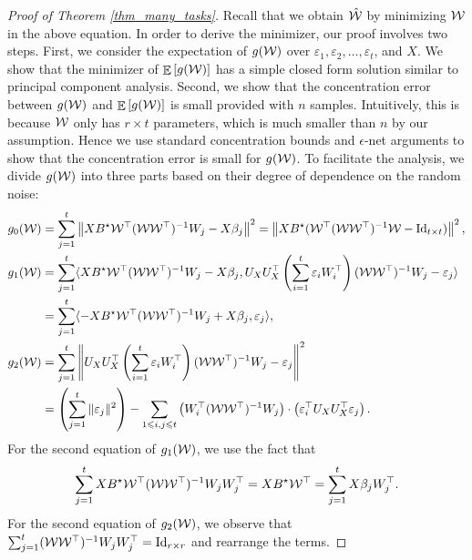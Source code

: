 \begin{proof}[Proof of Theorem \ref{thm_many_tasks}]
	Recall that we obtain $\hat{{\mathcal W}}$ by minimizing ${\mathcal W}$ in the above equation.
	In order to derive the minimizer, our proof involves two steps.
	First, we consider the expectation of $g({\mathcal W})$ over $\varepsilon_1, \varepsilon_2, \dots, \varepsilon_t$, and $X$.
	We show that the minimizer of $\mathop{\mathbb{E}}\left[ g({\mathcal W}) \right]$ has a simple closed form solution similar to principal component analysis.
	Second, we show that the concentration error between $g({\mathcal W})$ and $\mathop{\mathbb{E}}\left[ g({\mathcal W}) \right]$ is small provided with $n$ samples.
	Intuitively, this is because ${\mathcal W}$ only has $r \times t$ parameters, which is much smaller than $n$ by our assumption.
	Hence we use standard concentration bounds and $\epsilon$-net arguments to show that the concentration error is small for $g({\mathcal W})$.
	To facilitate the analysis, we divide $g({\mathcal W})$ into three parts based on their degree of dependence on the random noise:
	\begin{align*}
		g_0({\mathcal W}) &= \sum_{j=1}^t \left\| XB^{\star} {\mathcal W}^{\top} ({\mathcal W}{\mathcal W}^{\top})^{-1} W_j - X\beta_j \right\|^2 = \left\| X B^{\star} ({\mathcal W}^{\top} ({\mathcal W}{\mathcal W}^{\top})^{-1} {\mathcal W} - \operatorname{Id}_{t\times t}) \right\|^2, \\
		g_1({\mathcal W}) &= \sum_{j=1}^t \langle XB^{\star} {\mathcal W}^{\top} ({\mathcal W}{\mathcal W}^{\top})^{-1}W_j - X\beta_j, U_X U_X^{\top} \left({\sum_{i=1}^t \varepsilon_i W_i^{\top}}\right) ({\mathcal W}{\mathcal W}^{\top})^{-1} W_j - \varepsilon_j \rangle \\
		&= \sum_{j=1}^t \langle -X B^{\star} {\mathcal W}^{\top} ({\mathcal W} {\mathcal W}^{\top})^{-1} W_j + X\beta_j, \varepsilon_j \rangle, \\
		g_2({\mathcal W}) &= \sum_{j=1}^t \left\| U_X U_X^{\top} \left({\sum_{i=1}^t \varepsilon_i W_i^{\top}}\right) ({\mathcal W}{\mathcal W}^{\top})^{-1}W_j - \varepsilon_j \right\|^2 \\
		&= \left({\sum_{j=1}^t \|\varepsilon_j\|^2}\right) - \sum_{1\leqslant i,j\leqslant t} \left({W_i^{\top} ({\mathcal W} {\mathcal W}^{\top})^{-1} W_j}\right) \cdot \left({\varepsilon_i^{\top} U_X U_X^{\top} \varepsilon_j}\right).
	\end{align*}
	For the second equation of $g_1({\mathcal W})$, we use the fact that
		\[ \sum_{j=1}^t X B^{\star} {\mathcal W}^{\top} ({\mathcal W}{\mathcal W}^{\top})^{-1} W_j W_j^{\top} = X B^{\star} {\mathcal W}^{\top} = \sum_{j=1}^t X \beta_j W_j^{\top}. \]
	For the second equation of $g_2({\mathcal W})$, we observe that $\sum_{j=1}^t ({\mathcal W}{\mathcal W}^{\top})^{-1} W_j W_j^{\top} = \operatorname{Id}_{r\times r}$ and rearrange the terms.


\end{proof}
